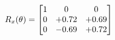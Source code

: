 \documentclass[preview]{standalone}
\begin{document}
\begin{align*}
\special{dvisvgm:raw <g id='unique000'>}R_{x}(\theta) = \begin{bmatrix}1 & 0 & 0 \\0 & +0.72 & +0.69 \\0 & -0.69 & +0.72\end{bmatrix}\special{dvisvgm:raw </g>}
\end{align*}
\end{document}

